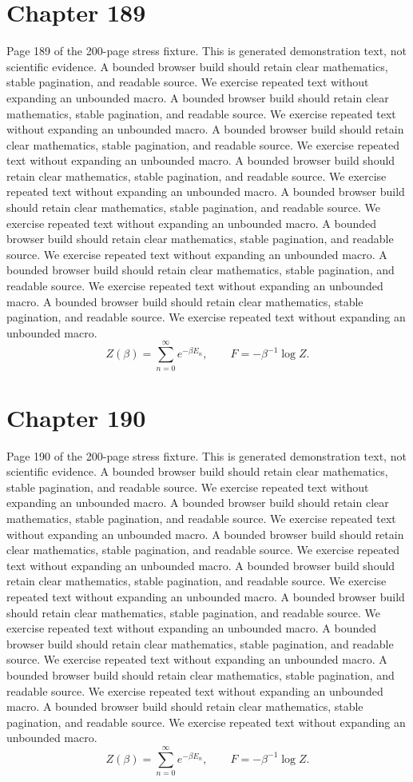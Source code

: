 \documentclass[11pt]{article}
\begin{document}
\section*{Chapter 189}
Page 189 of the 200-page stress fixture. This is generated demonstration text, not scientific evidence.
A bounded browser build should retain clear mathematics, stable pagination, and readable source. We exercise repeated text without expanding an unbounded macro.
A bounded browser build should retain clear mathematics, stable pagination, and readable source. We exercise repeated text without expanding an unbounded macro.
A bounded browser build should retain clear mathematics, stable pagination, and readable source. We exercise repeated text without expanding an unbounded macro.
A bounded browser build should retain clear mathematics, stable pagination, and readable source. We exercise repeated text without expanding an unbounded macro.
A bounded browser build should retain clear mathematics, stable pagination, and readable source. We exercise repeated text without expanding an unbounded macro.
A bounded browser build should retain clear mathematics, stable pagination, and readable source. We exercise repeated text without expanding an unbounded macro.
A bounded browser build should retain clear mathematics, stable pagination, and readable source. We exercise repeated text without expanding an unbounded macro.
A bounded browser build should retain clear mathematics, stable pagination, and readable source. We exercise repeated text without expanding an unbounded macro.
\[Z(\beta)=\sum_{n=0}^{\infty}e^{-\beta E_n},\qquad F=-\beta^{-1}\log Z.\]
\newpage
\section*{Chapter 190}
Page 190 of the 200-page stress fixture. This is generated demonstration text, not scientific evidence.
A bounded browser build should retain clear mathematics, stable pagination, and readable source. We exercise repeated text without expanding an unbounded macro.
A bounded browser build should retain clear mathematics, stable pagination, and readable source. We exercise repeated text without expanding an unbounded macro.
A bounded browser build should retain clear mathematics, stable pagination, and readable source. We exercise repeated text without expanding an unbounded macro.
A bounded browser build should retain clear mathematics, stable pagination, and readable source. We exercise repeated text without expanding an unbounded macro.
A bounded browser build should retain clear mathematics, stable pagination, and readable source. We exercise repeated text without expanding an unbounded macro.
A bounded browser build should retain clear mathematics, stable pagination, and readable source. We exercise repeated text without expanding an unbounded macro.
A bounded browser build should retain clear mathematics, stable pagination, and readable source. We exercise repeated text without expanding an unbounded macro.
A bounded browser build should retain clear mathematics, stable pagination, and readable source. We exercise repeated text without expanding an unbounded macro.
\[Z(\beta)=\sum_{n=0}^{\infty}e^{-\beta E_n},\qquad F=-\beta^{-1}\log Z.\]
\newpage
\end{document}
